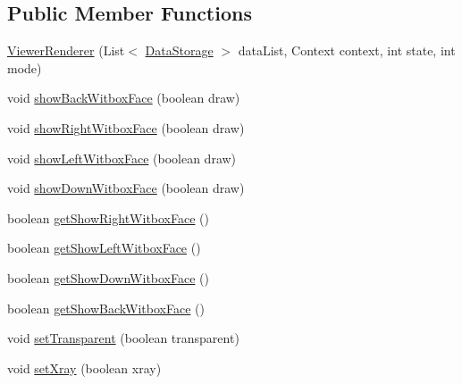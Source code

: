 \subsection*{Public Member Functions}
\begin{DoxyCompactItemize}
\item 
\hyperlink{classandroid_1_1app_1_1printerapp_1_1viewer_1_1_viewer_renderer_ad86f712d654cbdae5064c329365dddfc}{Viewer\+Renderer} (List$<$ \hyperlink{classandroid_1_1app_1_1printerapp_1_1viewer_1_1_data_storage}{Data\+Storage} $>$ data\+List, Context context, int state, int mode)
\item 
void \hyperlink{classandroid_1_1app_1_1printerapp_1_1viewer_1_1_viewer_renderer_ad20029a8666af89c97584cc40cf0fa72}{show\+Back\+Witbox\+Face} (boolean draw)
\item 
void \hyperlink{classandroid_1_1app_1_1printerapp_1_1viewer_1_1_viewer_renderer_ab51da980e23ddc2ea6924f0cffdf95bf}{show\+Right\+Witbox\+Face} (boolean draw)
\item 
void \hyperlink{classandroid_1_1app_1_1printerapp_1_1viewer_1_1_viewer_renderer_a20943e056128a1e9de81f9d00d68225b}{show\+Left\+Witbox\+Face} (boolean draw)
\item 
void \hyperlink{classandroid_1_1app_1_1printerapp_1_1viewer_1_1_viewer_renderer_a8a79d91e5293f0e0206964e7e0da161d}{show\+Down\+Witbox\+Face} (boolean draw)
\item 
boolean \hyperlink{classandroid_1_1app_1_1printerapp_1_1viewer_1_1_viewer_renderer_a3bbf9e9336df1d83732dd91b54514582}{get\+Show\+Right\+Witbox\+Face} ()
\item 
boolean \hyperlink{classandroid_1_1app_1_1printerapp_1_1viewer_1_1_viewer_renderer_a33aa3d7c701a5986092057412fb7bd28}{get\+Show\+Left\+Witbox\+Face} ()
\item 
boolean \hyperlink{classandroid_1_1app_1_1printerapp_1_1viewer_1_1_viewer_renderer_a84cacfd6433115c2cee6052557b4961b}{get\+Show\+Down\+Witbox\+Face} ()
\item 
boolean \hyperlink{classandroid_1_1app_1_1printerapp_1_1viewer_1_1_viewer_renderer_a86dbbebc7782d15c4787eb2c357c1b39}{get\+Show\+Back\+Witbox\+Face} ()
\item 
void \hyperlink{classandroid_1_1app_1_1printerapp_1_1viewer_1_1_viewer_renderer_aa84330bd10af07d2e4be205f5bd4a089}{set\+Transparent} (boolean transparent)
\item 
void \hyperlink{classandroid_1_1app_1_1printerapp_1_1viewer_1_1_viewer_renderer_a3b8ccafa67ba5d423cf90392561f5806}{set\+Xray} (boolean xray)
\item 

\end{DoxyCompactItemize}
